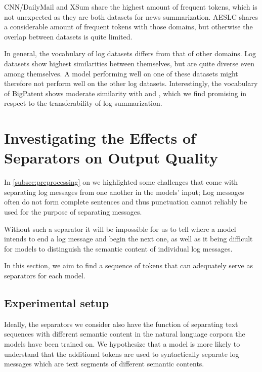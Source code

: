CNN/DailyMail and XSum share the highest amount of frequent tokens,
which is not unexpected as they are both datasets for news summarization.
AESLC shares a considerable amount of frequent tokens with those domains,
but otherwise the overlap between datasets is quite limited.

In general, the vocabulary of log datasets differs from that of other domains.
Log datasets show highest similarities between themselves,
but are quite diverse even among themselves.
A model performing well on one of these datasets might therefore not perform well on the other log datasets.
Interestingly, the vocabulary of BigPatent shows moderate similarity with \telco{} and \logsummary{},
which we find promising in respect to the transferability of log summarization.

\section{Investigating the Effects of Separators on Output Quality}\label{sec:preliminary_separators}

In \autoref{subsec:preprocessing} on  we highlighted some challenges that come with
separating log messages from one another in the models' input;
Log messages often do not form complete sentences and thus punctuation cannot reliably be used for the purpose of separating messages.

Without such a separator it will be impossible for us to tell
where a model intends to end a log message and begin the next one,
as well as it being difficult for models to distinguish the semantic content of individual log messages.

In this section, we aim to find a sequence of tokens that can adequately serve as
separators for each model.

\subsection{Experimental setup}

Ideally, the separators we consider also have the function of separating text sequences
with different semantic content in the natural language corpora the models have been trained on.
We hypothesize that a model is more likely to understand that the additional tokens
are used to syntactically separate log messages which are text segments of different semantic contents.

